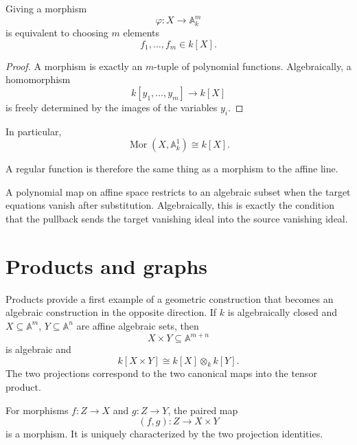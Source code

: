 \begin{proposition}
\label{prop:vi04-maps-to-affine-space}
Giving a morphism
\[
\varphi:X\to\mathbb A_k^m
\]
is equivalent to choosing \(m\) elements
\[
f_1,\dots,f_m\in k[X].
\]
\end{proposition}

\begin{proof}
A morphism is exactly an \(m\)-tuple of polynomial functions.  Algebraically, a homomorphism
\[
k[y_1,\dots,y_m]\to k[X]
\]
is freely determined by the images of the variables \(y_i\).
\end{proof}

In particular,
\[
\operatorname{Mor}(X,\mathbb A_k^1)
\cong
k[X].
\]

A regular function is therefore the same thing as a morphism to the affine line.

\begin{example}\label{ex:vi04-expand-03}
A polynomial map on affine space restricts to an algebraic subset when the target equations vanish after substitution.  Algebraically, this is exactly the condition that the pullback sends the target vanishing ideal into the source vanishing ideal.
\end{example}
\section{Products and graphs}
\label{sec:vi04-products-graphs}

Products provide a first example of a geometric construction that becomes an algebraic
construction in the opposite direction.  If \(k\) is algebraically closed and
\(X\subseteq\mathbb A^m\), \(Y\subseteq\mathbb A^n\) are affine algebraic sets, then
\[
X\times Y\subseteq\mathbb A^{m+n}
\]
is algebraic and
\[
k[X\times Y]\cong k[X]\otimes_k k[Y].
\]
The two projections correspond to the two canonical maps into the tensor product.

For morphisms \(f:Z\to X\) and \(g:Z\to Y\), the paired map
\[
(f,g):Z\to X\times Y
\]
is a morphism.  It is uniquely characterized by the two projection identities.

\begin{center}
\end{center}

